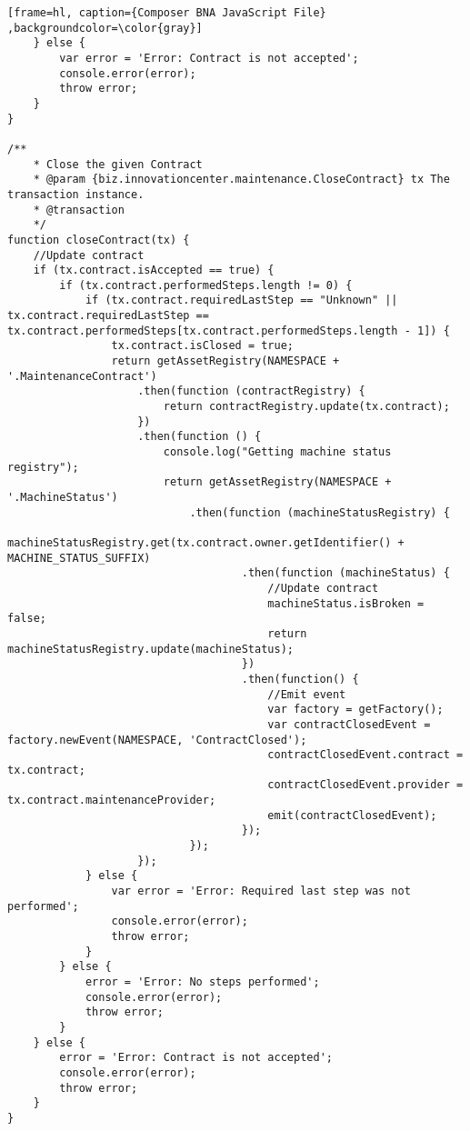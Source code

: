 \begin{appendices}
\begin{lstlisting}[frame=hl, caption={Composer BNA JavaScript File} ,backgroundcolor=\color{gray}]
    } else {
        var error = 'Error: Contract is not accepted';
        console.error(error);
        throw error;
    }
}

/**
    * Close the given Contract
    * @param {biz.innovationcenter.maintenance.CloseContract} tx The transaction instance.
    * @transaction
    */
function closeContract(tx) {
    //Update contract
    if (tx.contract.isAccepted == true) {
        if (tx.contract.performedSteps.length != 0) {
            if (tx.contract.requiredLastStep == "Unknown" || tx.contract.requiredLastStep == tx.contract.performedSteps[tx.contract.performedSteps.length - 1]) {
                tx.contract.isClosed = true;
                return getAssetRegistry(NAMESPACE + '.MaintenanceContract')
                    .then(function (contractRegistry) {
                        return contractRegistry.update(tx.contract);
                    })
                    .then(function () {
                        console.log("Getting machine status registry");
                        return getAssetRegistry(NAMESPACE + '.MachineStatus')
                            .then(function (machineStatusRegistry) {
                                machineStatusRegistry.get(tx.contract.owner.getIdentifier() + MACHINE_STATUS_SUFFIX)
                                    .then(function (machineStatus) {
                                        //Update contract
                                        machineStatus.isBroken = false;
                                        return machineStatusRegistry.update(machineStatus);
                                    })
                                    .then(function() {
                                        //Emit event
                                        var factory = getFactory();
                                        var contractClosedEvent = factory.newEvent(NAMESPACE, 'ContractClosed');
                                        contractClosedEvent.contract = tx.contract;
                                        contractClosedEvent.provider = tx.contract.maintenanceProvider;
                                        emit(contractClosedEvent);
                                    });
                            });
                    });
            } else {
                var error = 'Error: Required last step was not performed';
                console.error(error);
                throw error;
            }
        } else {
            error = 'Error: No steps performed';
            console.error(error);
            throw error;
        }
    } else {
        error = 'Error: Contract is not accepted';
        console.error(error);
        throw error;
    }
}


\end{lstlisting}
\end{appendices}
